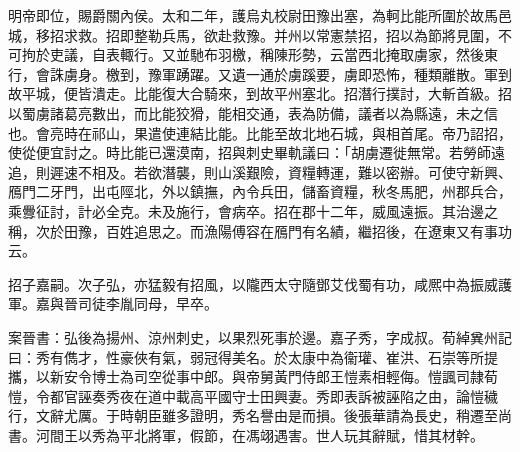 \begin{pinyinscope}
明帝即位，賜爵關內侯。太和二年，護烏丸校尉田豫出塞，為軻比能所圍於故馬邑城，移招求救。招即整勒兵馬，欲赴救豫。并州以常憲禁招，招以為節將見圍，不可拘於吏議，自表輙行。又並馳布羽檄，稱陳形勢，云當西北掩取虜家，然後東行，會誅虜身。檄到，豫軍踴躍。又遺一通於虜蹊要，虜即恐怖，種類離散。軍到故平城，便皆潰走。比能復大合騎來，到故平州塞北。招潛行撲討，大斬首級。招以蜀虜諸葛亮數出，而比能狡猾，能相交通，表為防備，議者以為縣遠，未之信也。會亮時在祁山，果遣使連結比能。比能至故北地石城，與相首尾。帝乃詔招，使從便宜討之。時比能已還漠南，招與刺史畢軌議曰：「胡虜遷徙無常。若勞師遠追，則遲速不相及。若欲潛襲，則山溪艱險，資糧轉運，難以密辦。可使守新興、鴈門二牙門，出屯陘北，外以鎮撫，內令兵田，儲畜資糧，秋冬馬肥，州郡兵合，乘釁征討，計必全克。未及施行，會病卒。招在郡十二年，威風遠振。其治邊之稱，次於田豫，百姓追思之。而漁陽傅容在鴈門有名績，繼招後，在遼東又有事功云。

招子嘉嗣。次子弘，亦猛毅有招風，以隴西太守隨鄧艾伐蜀有功，咸熈中為振威護軍。嘉與晉司徒李胤同母，早卒。

案晉書：弘後為揚州、涼州刺史，以果烈死事於邊。嘉子秀，字成叔。荀綽兾州記曰：秀有儁才，性豪俠有氣，弱冠得美名。於太康中為衞瓘、崔洪、石崇等所提攜，以新安令博士為司空從事中郎。與帝舅黃門侍郎王愷素相輕侮。愷諷司隷荀愷，令都官誣奏秀夜在道中載高平國守士田興妻。秀即表訴被誣陷之由，論愷穢行，文辭尤厲。于時朝臣雖多證明，秀名譽由是而損。後張華請為長史，稍遷至尚書。河間王以秀為平北將軍，假節，在馮翊遇害。世人玩其辭賦，惜其材幹。


\end{pinyinscope}